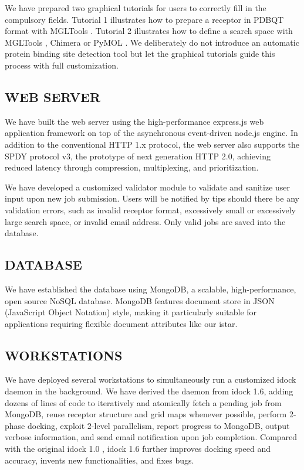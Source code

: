 \documentclass[12pt]{article}
\begin{document}
We have prepared two graphical tutorials for users to correctly fill in the compulsory fields. Tutorial 1 illustrates how to prepare a receptor in PDBQT format with MGLTools \citep{596}. Tutorial 2 illustrates how to define a search space with MGLTools \citep{596}, Chimera \citep{1219} or PyMOL \citep{1221}. We deliberately do not introduce an automatic protein binding site detection tool but let the graphical tutorials guide this process with full customization.

\subsection*{\sffamily \large WEB SERVER}

We have built the web server using the high-performance express.js web application framework on top of the asynchronous event-driven node.js engine. In addition to the conventional HTTP 1.x protocol, the web server also supports the SPDY protocol v3, the prototype of next generation HTTP 2.0, achieving reduced latency through compression, multiplexing, and prioritization.

We have developed a customized validator module to validate and sanitize user input upon new job submission. Users will be notified by tips should there be any validation errors, such as invalid receptor format, excessively small or excessively large search space, or invalid email address. Only valid jobs are saved into the database.

\subsection*{\sffamily \large DATABASE}

We have established the database using MongoDB, a scalable, high-performance, open source NoSQL database. MongoDB features document store in JSON (JavaScript Object Notation) style, making it particularly suitable for applications requiring flexible document attributes like our istar. 

\subsection*{\sffamily \large WORKSTATIONS}

We have deployed several workstations to simultaneously run a customized idock daemon in the background. We have derived the daemon from idock 1.6, adding dozens of lines of code to iteratively and atomically fetch a pending job from MongoDB, reuse receptor structure and grid maps whenever possible, perform 2-phase docking, exploit 2-level parallelism, report progress to MongoDB, output verbose information, and send email notification upon job completion. Compared with the original idock 1.0 \citep{1153}, idock 1.6 further improves docking speed and accuracy, invents new functionalities, and fixes bugs.
\end{document}
